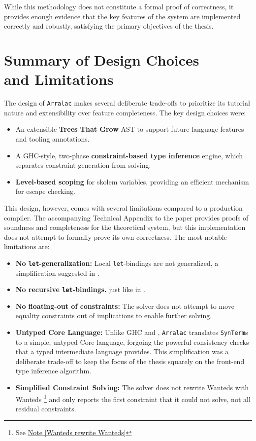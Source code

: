 While this methodology does not constitute a formal proof of correctness, it provides enough evidence that the key features of the system are implemented correctly and robustly, satisfying the primary objectives of the thesis.

\section{Summary of Design Choices \\ and Limitations}
\label{sec:Design:Summary}

The design of \texttt{Arralac} makes several deliberate trade-offs to prioritize its tutorial nature and extensibility over feature completeness. The key design choices were:
\begin{itemize}
    \item An extensible \textbf{Trees That Grow} AST to support future language features and tooling annotations.
    \item A GHC-style, two-phase \textbf{constraint-based type inference} engine, which separates constraint generation from solving.
    \item \textbf{Level-based scoping} for skolem variables, providing an efficient mechanism for escape checking.
\end{itemize}

This design, however, comes with several limitations compared to a production compiler. The accompanying Technical Appendix to the paper \cite{practical-type-inference-proofs} provides proofs of soundness and completeness for the theoretical system, but this implementation does not attempt to formally prove its own correctness. The most notable limitations are:
\begin{itemize}
    \item \textbf{No \texttt{let}-generalization:} Local \texttt{let}-bindings are not generalized, a simplification suggested in \cite{vytiniotis-outsideinx-2011}.
    \item \textbf{No recursive \texttt{let}-bindings.} just like in \cite{jones-practical-2007}.
    \item \textbf{No floating-out of constraints:} The solver does not attempt to move equality constraints out of implications to enable further solving.
    \item \textbf{Untyped Core Language:} Unlike GHC and \cite{jones-practical-2007}, \texttt{Arralac} translates \texttt{SynTerm}s to a simple, untyped Core language, forgoing the powerful consistency checks that a typed intermediate language provides. This simplification was a deliberate trade-off to keep the focus of the thesis squarely on the front-end type inference algorithm.
    \item \textbf{Simplified Constraint Solving:} The solver does not rewrite Wanteds with Wanteds \footnote{See \href{https://github.com/ghc/ghc/blob/ed38c09bd89307a7d3f219e1965a0d9743d0ca73/compiler/GHC/Tc/Types/Constraint.hs\#L2415}{Note [Wanteds rewrite Wanteds]}} and only reports the first constraint that it could not solve, not all residual constraints.
\end{itemize}